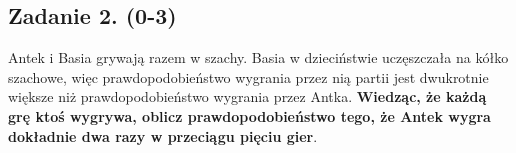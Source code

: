 \subsection*{Zadanie 2. (0-3)}
Antek i Basia grywają razem w szachy. Basia w dzieciństwie uczęszczała na kółko szachowe, więc prawdopodobieństwo wygrania przez nią partii jest dwukrotnie większe niż prawdopodobieństwo wygrania przez Antka. \textbf{Wiedząc, że każdą grę ktoś wygrywa, oblicz prawdopodobieństwo tego, że Antek wygra dokładnie dwa razy w przeciągu pięciu gier}.